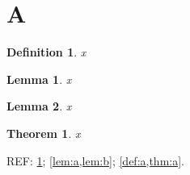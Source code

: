 \documentclass{article}
\newtheorem{definition}{Definition}[section]
\newtheorem{theorem}{Theorem}[section]\newtheorem{lemma}{Lemma}[section]
\begin{document}
\section{A}
\begin{definition}\label{def:a}x\end{definition}
\begin{lemma}\label{lem:a}x\end{lemma}
\begin{lemma}\label{lem:b}x\end{lemma}
\begin{theorem}\label{thm:a}x\end{theorem}
REF: \cref{lem:a}; \cref{lem:a,lem:b}; \cref{def:a,thm:a}.
\end{document}
